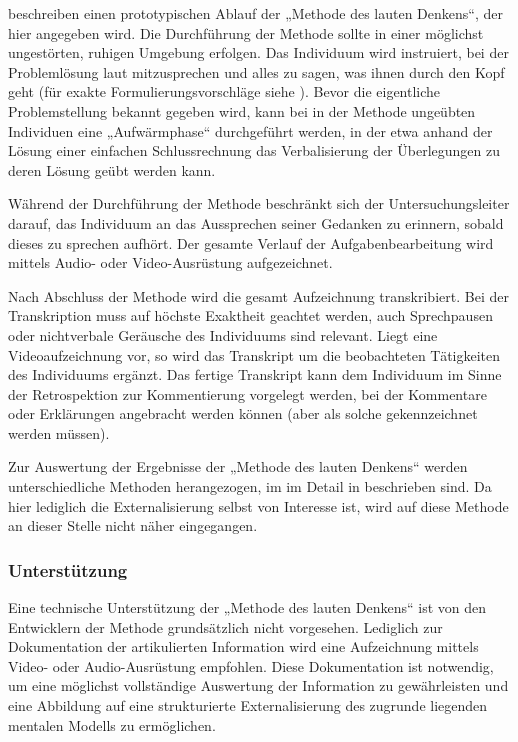 \citet{Van-Someren94} beschreiben einen prototypischen Ablauf der „Methode des lauten Denkens“, der hier angegeben wird. Die Durchführung der Methode sollte in einer möglichst ungestörten, ruhigen Umgebung erfolgen. Das Individuum wird instruiert, bei der Problemlösung laut mitzusprechen und alles zu sagen, was ihnen durch den Kopf geht (für exakte Formulierungsvorschläge siehe \citep[][S. 43]{Van-Someren94}). Bevor die eigentliche Problemstellung bekannt gegeben wird, kann bei in der Methode ungeübten Individuen eine „Aufwärmphase“ durchgeführt werden, in der etwa anhand der Lösung einer einfachen Schlussrechnung das Verbalisierung der Überlegungen zu deren Lösung geübt werden kann.

Während der Durchführung der Methode beschränkt sich der Untersuchungsleiter darauf, das Individuum an das Aussprechen seiner Gedanken zu erinnern, sobald dieses zu sprechen aufhört. Der gesamte Verlauf der Aufgabenbearbeitung wird mittels Audio- oder Video-Ausrüstung aufgezeichnet.

Nach Abschluss der Methode wird die gesamt Aufzeichnung transkribiert. Bei der Transkription muss auf höchste Exaktheit geachtet werden, auch Sprechpausen oder nichtverbale Geräusche des Individuums sind relevant. Liegt eine Videoaufzeichnung vor, so wird das Transkript um die beobachteten Tätigkeiten des Individuums ergänzt. Das fertige Transkript kann dem Individuum im Sinne der Retrospektion zur Kommentierung vorgelegt werden, bei der Kommentare oder Erklärungen angebracht werden können (aber als solche gekennzeichnet werden müssen).

Zur Auswertung der Ergebnisse der „Methode des lauten Denkens“ werden unterschiedliche  Methoden herangezogen, im im Detail in \citep{Van-Someren94} beschrieben sind. Da hier lediglich die Externalisierung selbst von Interesse ist, wird auf diese Methode an dieser Stelle nicht näher eingegangen.

\subsubsection{Unterstützung}

Eine technische Unterstützung der „Methode des lauten Denkens“ ist von den Entwicklern der Methode \citep{Van-Someren94} grundsätzlich nicht vorgesehen. Lediglich zur Dokumentation der artikulierten Information wird eine Aufzeichnung mittels Video- oder Audio-Ausrüstung empfohlen. Diese Dokumentation ist notwendig, um eine möglichst vollständige Auswertung der Information zu gewährleisten und eine Abbildung auf eine strukturierte Externalisierung des zugrunde liegenden mentalen Modells zu ermöglichen. 


